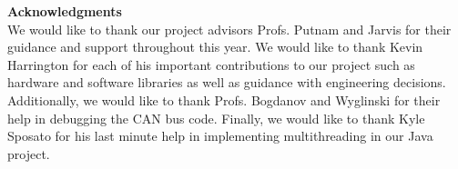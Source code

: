 \noindent \textbf{\Large Acknowledgments} \\

\noindent We would like to thank our project advisors Profs. Putnam and Jarvis for their guidance and support throughout this year. We would like to thank Kevin Harrington for each of his important contributions to our project such as hardware and software libraries as well as guidance with engineering decisions. Additionally, we would like to thank Profs. Bogdanov and Wyglinski for their help in debugging the CAN bus code. Finally, we would like to thank Kyle Sposato for his last minute help in implementing multithreading in our Java project.
\\ 
\newpage
